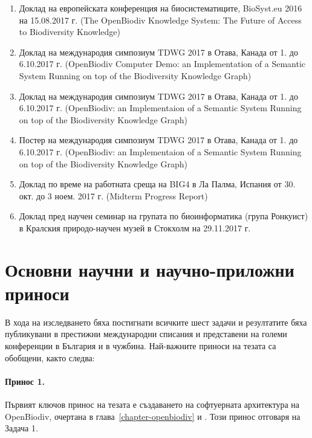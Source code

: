 \begin{enumerate}
    \item Доклад на европейската конференция на биосистематиците, BioSyst.eu 2016 на 15.08.2017 г. (The OpenBiodiv Knowledge System: The Future of Access to Biodiversity Knowledge)
    \item Доклад на международия симпозиум TDWG 2017 в Отава, Канада от 1. до 6.10.2017 г. (OpenBiodiv Computer Demo: an Implementation of a Semantic System Running on top of the Biodiversity Knowledge Graph)
    \item Доклад на международия симпозиум TDWG 2017 в Отава, Канада от 1. до 6.10.2017 г. (OpenBiodiv: an Implementaion of a Semantic System Running on top of the Biodiversity Knowledge Graph)
    \item Постер на международия симпозиум TDWG 2017 в Отава, Канада от 1. до 6.10.2017 г. (OpenBiodiv: an Implementaion of a Semantic System Running on top of the Biodiversity Knowledge Graph)
    \item Доклад по време на работната среща на BIG4 в Ла Палма, Испания от 30. окт. до 3 ноем. 2017 г. (Midterm Progress Report)
    \item Доклад пред научен семинар на групата по биоинформатика (група Ронкуист) в Кралския природо-научен музей в Стокхолм на 29.11.2017 г.
\end{enumerate}

\section*{Основни научни и научно-приложни приноси}

В хода на изследването бяха постигнати всичките шест задачи и резултатите бяха публикувани в престижни международни списания и представени на големи конференции в България и в чужбина. Най-важните приноси на тезата са обобщени, както следва:

\paragraph{Принос 1.} Първият ключов принос на тезата е създаването на софтуерната архитектура на OpenBiodiv, очертана в глава~\ref{chapter-openbiodiv} и \cite{senderov_open_2016}. Този принос отговаря на Задача 1.

